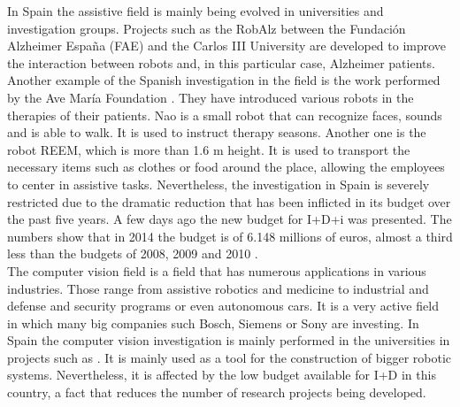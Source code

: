 In Spain the assistive field is mainly being evolved in universities and investigation groups. 
Projects such as the RobAlz between the Fundación Alzheimer España (FAE) and the Carlos III University \cite{robalz} are developed to improve the interaction between robots and, in this particular case, Alzheimer patients.  
Another example of the Spanish investigation in the field is the work performed by the Ave María Foundation \cite{assistive_spain}.
They have introduced various robots in the therapies of their patients. 
Nao is a small robot that can recognize faces, sounds and is able to walk. 
It is used to instruct therapy seasons. 
Another one is the robot REEM, which is more than 1.6 m height. 
It is used to transport the necessary items such as clothes or food around the place, allowing the employees to center in assistive tasks. 
Nevertheless, the investigation in Spain is severely restricted due to the dramatic reduction that has been inflicted in its budget over the past five years. 
A few days ago the new budget for I+D+i was presented. 
The numbers show that in 2014 the budget is of 6.148 millions of euros, almost a third less than the budgets of 2008, 2009 and 2010 \cite{budget_i_mas_d}.
\\

The computer vision field is a field that has numerous applications in various industries. 
Those range from assistive robotics and medicine to industrial and defense and security programs or even autonomous cars.
It is a very active field in which many big companies such Bosch, Siemens or Sony are investing. 
In Spain the computer vision investigation is mainly performed in the universities in projects such as \cite{robalz}. 
It is mainly used as a tool for the construction of bigger robotic systems. 
Nevertheless, it is affected by the low budget available for I+D in this country, a fact that reduces the number of research projects being developed. 
 




